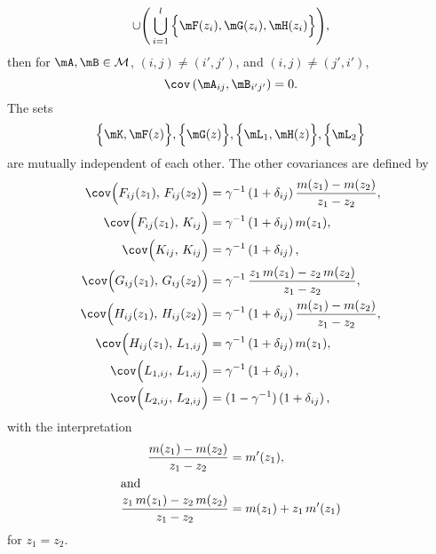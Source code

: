 \begin{lemma}
\[        \cup
        \Bigg(
        \bigcup_{i=1}^l
            \Big\{ 
                \mF(z_i), \mG(z_i), \mH(z_i)
            \Big\}
        \Bigg),
    \] 
    then for $\mA, \mB \in \mathcal{M}$, $(i,j) \neq (i',j')$, and 
    $(i,j) \neq (j',i')$,
    \[
        \cov\left( \mA_{ij}, \mB_{i'j'} \right)
        =
        0.
    \]
    The sets
    \[
        \Big\{ \mK, \mF( z ) \Big\},
        \Big\{ \mG( z) \Big\},
        \Big\{ \mL_1, \mH( z )\Big\},
        \Big\{ \mL_2 \Big\}
    \]
    are mutually independent of each other.
    The other covariances are defined by
    \begin{align*}
        \cov\Big( F_{ij}(z_1), \, F_{ij}(z_2) \Big)
            &= \gamma^{-1}
               \left( 1 + \delta_{ij} \right)
               \frac{ m(z_1) - m(z_2) }
                    { z_1 - z_2 }, \\
        \cov\Big( F_{ij}(z_1), \, K_{ij} \Big)
            &= \gamma^{-1}
               \left( 1 + \delta_{ij} \right) m(z_1), \\
        \cov\Big( K_{ij}, \, K_{ij} \Big)
            &= \gamma^{-1}
               \left( 1 + \delta_{ij} \right), \\
        \cov\Big( G_{ij}(z_1), \, G_{ij}(z_2) \Big)
            &= \gamma^{-1} \,
               \frac{ z_1 \, m(z_1) - z_2 \, m(z_2) }
                    { z_1 - z_2 }, \\
        \cov\Big( H_{ij}(z_1), \, H_{ij}(z_2) \Big)
            &= \gamma^{-1}
               \left( 1 + \delta_{ij} \right)
               \frac{ m(z_1) - m(z_2) }
                    { z_1 - z_2 }, \\
        \cov\Big( H_{ij}(z_1), \, L_{1,ij} \Big)
            &= \gamma^{-1}
               \left( 1 + \delta_{ij} \right) m(z_1), \\
        \cov\Big( L_{1,ij}, \, L_{1,ij} \Big)
            &= \gamma^{-1}
               \left( 1 + \delta_{ij} \right), \\
        \cov\Big( L_{2,ij}, \, L_{2,ij} \Big)
            &= (1 - \gamma^{-1})
               \left( 1 + \delta_{ij} \right),
    \end{align*}
    with the interpretation
    \begin{align*}
        \frac{ m(z_1) - m(z_2) }
             { z_1 - z_2 }
            &=
                m'(z_1), \\
    \intertext{and}
        \frac{ z_1 \, m(z_1) - z_2 \, m(z_2) }
             { z_1 - z_2 }
            &= m( z_1 ) + z_1 \, m'(z_1)
    \end{align*}
    for $z_1 = z_2$.
\end{lemma}
